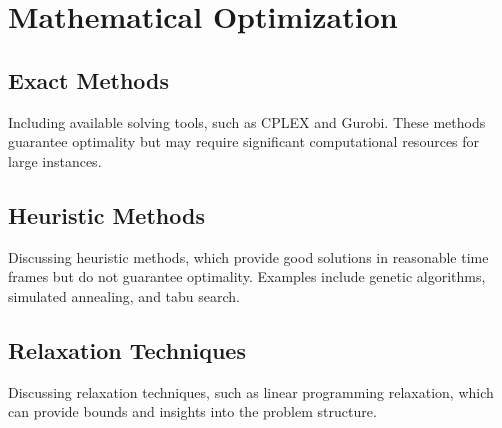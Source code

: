 \section{Mathematical Optimization}


\subsection{Exact Methods}

    Including available solving tools, such as CPLEX and Gurobi. These methods guarantee optimality but may require significant computational resources for large instances.

\subsection{Heuristic Methods}

    Discussing heuristic methods, which provide good solutions in reasonable time frames but do not guarantee optimality. Examples include genetic algorithms, simulated annealing, and tabu search.

\subsection{Relaxation Techniques}

    Discussing relaxation techniques, such as linear programming relaxation, which can provide bounds and insights into the problem structure.